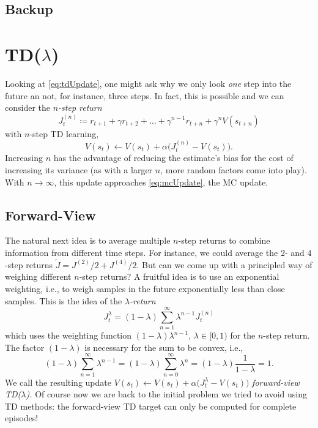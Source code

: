 		\subsection{Backup} %

	\section{\acs{TD}(\(\lambda\))}
		\label{sec:tdLambda}

		Looking at \eqref{eq:tdUpdate}, one might ask why we only look \emph{one} step into the future an not, for instance, three steps. In fact, this is possible and we can consider the \emph{\(n\)-step return}
		\begin{equation}
			J_t^{(n)} \coloneqq r_{t + 1} + \gamma r_{t + 2} + \dots + \gamma^{n - 1} r_{t + n} + \gamma^n V(s_{t + n})
		\end{equation}
		with \(n\)-step \ac{TD} learning,
		\begin{equation}
			V(s_t) \gets V(s_t) + \alpha \bigl( J_t^{(n)} - V(s_t) \bigr).
		\end{equation}
		Increasing \(n\) has the advantage of reducing the estimate's bias for the cost of increasing its variance (as with a larger \(n\), more random factors come into play). With \(n \to \infty\), this update approaches \eqref{eq:mcUpdate}, the \ac{MC} update.

		\subsection{Forward-View}
			The natural next idea is to average multiple \(n\)-step returns to combine information from different time steps. For instance, we could average the \(2\)- and \(4\)-step returns \( \tilde{J} = J^{(2)}/2 + J^{(4)}/2 \). But can we come up with a principled way of weighing different \(n\)-step returns? A fruitful idea is to use an exponential weighting, i.e., to weigh samples in the future exponentially less than close samples. This is the idea of the \emph{\(\lambda\)-return}
			\begin{equation}
				J_t^\lambda = (1 - \lambda) \sum_{n = 1}^{\infty} \lambda^{n - 1} J_t^{(n)}
			\end{equation}
			which uses the weighting function \( (1 - \lambda) \lambda^{n - 1} \), \( \lambda \in [0, 1) \) for the \(n\)-step return. The factor \((1 - \lambda)\) is necessary for the sum to be convex, i.e.,
			\begin{equation}
				(1 - \lambda) \sum_{n = 1}^{\infty} \lambda^{n - 1}
					= (1 - \lambda) \sum_{n = 0}^{\infty} \lambda^n
					= (1 - \lambda) \frac{1}{1 - \lambda}
					= 1.
			\end{equation}
			We call the resulting update \( V(s_t) \gets V(s_t) + \alpha \bigl( J_t^\lambda - V(s_t) \bigr) \) \emph{forward-view TD(\(\lambda\)).} Of course now we are back to the initial problem we tried to avoid using \ac{TD} methods: the forward-view \ac{TD} target can only be computed for complete episodes!

